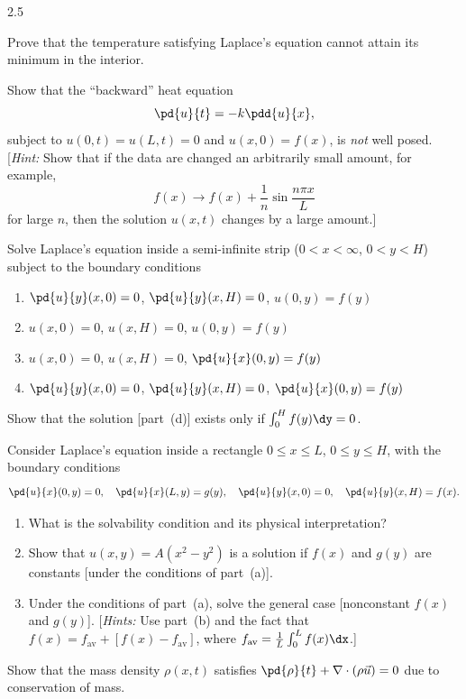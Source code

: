\begin{exercises}{2.5}
\item Prove that the temperature satisfying Laplace's equation cannot attain its minimum in the interior.

\item Show that the ``backward'' heat equation
\[
\pd{u}{t} = -k\pdd{u}{x},
\]
subject to $u(0,t) = u(L,t) = 0$ and $u(x,0) = f(x)$, is \emph{not} well posed. [\emph{Hint:} Show that if the data are changed an arbitrarily small amount, for example,
\[
f(x) \to f(x) + \frac{1}{n}\sin\frac{n\pi x}{L}
\]
for large $n$, then the solution $u(x,t)$ changes by a large amount.]

\item Solve Laplace's equation inside a semi-infinite strip ($0 < x < \infty$, $0 < y < H$) subject to the boundary conditions
\begin{enumerate}
\item[(a)] $\pd{u}{y}(x,0) = 0$, \quad $\pd{u}{y}(x,H) = 0$, \quad $u(0,y) = f(y)$
\item[(b)] $u(x,0) = 0$, \quad $u(x,H) = 0$, \quad $u(0,y) = f(y)$
\item[(c)] $u(x,0) = 0$, \quad $u(x,H) = 0$, \quad $\pd{u}{x}(0,y) = f(y)$
\item[(d)] $\pd{u}{y}(x,0) = 0$, \quad $\pd{u}{y}(x,H) = 0$, \quad $\pd{u}{x}(0,y) = f(y)$
\end{enumerate}
Show that the solution [part~(d)] exists only if $\int_0^H f(y)\dy = 0$.

\item Consider Laplace's equation inside a rectangle $0 \le x \le L$, $0 \le y \le H$, with the boundary conditions
\[
\pd{u}{x}(0,y) = 0, \quad \pd{u}{x}(L,y) = g(y), \quad \pd{u}{y}(x,0) = 0, \quad \pd{u}{y}(x,H) = f(x).
\]
\begin{enumerate}
\item[(a)] What is the solvability condition and its physical interpretation?
\item[(b)] Show that $u(x,y) = A(x^2 - y^2)$ is a solution if $f(x)$ and $g(y)$ are constants [under the conditions of part~(a)].
\item[(c)] Under the conditions of part~(a), solve the general case [nonconstant $f(x)$ and $g(y)$]. [\emph{Hints:} Use part~(b) and the fact that $f(x) = f_{\text{av}} + [f(x) - f_{\text{av}}]$, where $f_{\text{av}} = \frac{1}{L}\int_0^L f(x)\dx$.]
\end{enumerate}

\item Show that the mass density $\rho(x,t)$ satisfies $\pd{\rho}{t} + \nabla\cdot(\rho\vec{u}) = 0$ due to conservation of mass.


\end{exercises}
